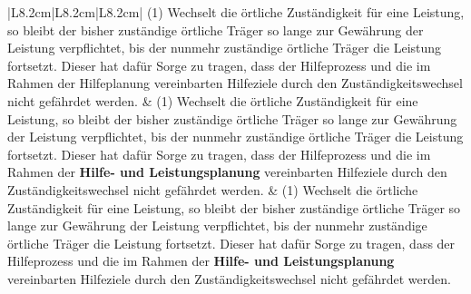 \documentclass[10pt,a4paper,landscape]{article}
\begin{document}
\begin{longtable}{|L{8.2cm}|L{8.2cm}|L{8.2cm}|}
(1) Wechselt die örtliche Zuständigkeit für  \newline eine Leistung, so bleibt der bisher  \newline zuständige örtliche Träger so lange zur  \newline Gewährung der Leistung verpflichtet, bis der  \newline nunmehr zuständige örtliche Träger die  \newline Leistung fortsetzt. Dieser hat dafür Sorge zu  \newline tragen, dass der Hilfeprozess und die im  \newline Rahmen der \textcolor{diffred}{Hilfeplanung} vereinbarten  \newline Hilfeziele durch den Zuständigkeitswechsel  \newline nicht gefährdet werden. & (1) Wechselt die örtliche Zuständigkeit für  \newline eine Leistung, so bleibt der bisher  \newline zuständige örtliche Träger so lange zur  \newline Gewährung der Leistung verpflichtet, bis  \newline der nunmehr zuständige örtliche Träger die  \newline Leistung fortsetzt. Dieser hat dafür Sorge  \newline zu tragen, dass der Hilfeprozess und die im  \newline Rahmen der \textbf{Hilfe- und Leistungsplanung}  \newline vereinbarten Hilfeziele durch den  \newline Zuständigkeitswechsel nicht gefährdet  \newline werden. & (1) Wechselt die örtliche Zuständigkeit für  \newline eine Leistung, so bleibt der bisher  \newline zuständige örtliche Träger so lange zur  \newline Gewährung der Leistung verpflichtet, bis  \newline der nunmehr zuständige örtliche Träger die  \newline Leistung fortsetzt. Dieser hat dafür Sorge  \newline zu tragen, dass der Hilfeprozess und die im  \newline Rahmen der \textbf{Hilfe- und Leistungsplanung}  \newline vereinbarten Hilfeziele durch den  \newline Zuständigkeitswechsel nicht gefährdet  \newline werden. \\

\end{longtable}
\end{document}
